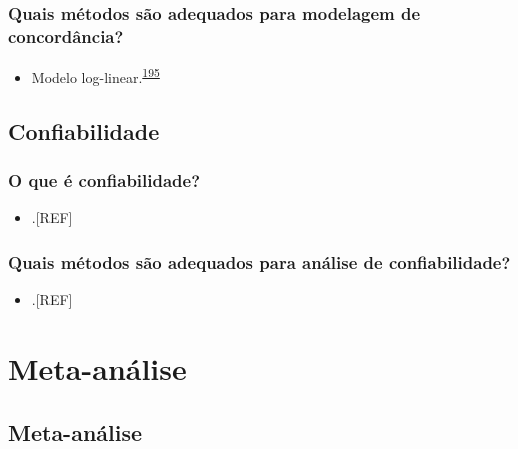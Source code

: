 \documentclass[
  a4paper,
]{book}
\providecommand{\tightlist}{%
  \setlength{\itemsep}{0pt}\setlength{\parskip}{0pt}}
\begin{document}
\hypertarget{quais-muxe9todos-suxe3o-adequados-para-modelagem-de-concorduxe2ncia}{%
\subsection{Quais métodos são adequados para modelagem de concordância?}\label{quais-muxe9todos-suxe3o-adequados-para-modelagem-de-concorduxe2ncia}}

\begin{itemize}
\tightlist
\item
  Modelo log-linear.\textsuperscript{\protect\hyperlink{ref-banerjee1999}{195}}
\end{itemize}

\hypertarget{confiabilidade}{%
\section{Confiabilidade}\label{confiabilidade}}

\hypertarget{o-que-uxe9-confiabilidade}{%
\subsection{O que é confiabilidade?}\label{o-que-uxe9-confiabilidade}}

\begin{itemize}
\tightlist
\item
  .{[}REF{]}
\end{itemize}

\hypertarget{quais-muxe9todos-suxe3o-adequados-para-anuxe1lise-de-confiabilidade}{%
\subsection{Quais métodos são adequados para análise de confiabilidade?}\label{quais-muxe9todos-suxe3o-adequados-para-anuxe1lise-de-confiabilidade}}

\begin{itemize}
\tightlist
\item
  .{[}REF{]}
\end{itemize}

\hypertarget{meta-analise}{%
\chapter{\texorpdfstring{\textbf{Meta-análise}}{Meta-análise}}\label{meta-analise}}

\hypertarget{meta-analise}{%
\section{Meta-análise}\label{meta-analise}}
\end{document}
